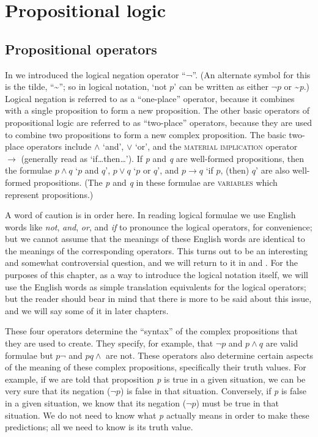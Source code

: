 \section{Propositional logic}\label{sec:4.3}
\subsection{Propositional operators}\label{sec:4.3.1}

In  we introduced the logical negation operator “¬”. (An alternate symbol for this is the tilde, “{\textasciitilde}”; so in logical notation, ‘not $p$’ can be written as either $\neg p$ or {\textasciitilde}\textit{p}.) Logical negation is referred to as a “one-place” operator, because it combines with a single proposition to form a new proposition. The other basic operators of propositional logic are referred to as “two-place” operators, because they are used to combine two propositions to form a new complex proposition. The basic two-place operators include $\wedge$ ‘and’, $\vee$ ‘or’, and the \textsc{material} \textsc{implication} operator $\rightarrow$ (generally read as ‘if…then…’). If \textit{p} and \textit{q} are well-formed propositions, then the formulae $p \wedge q$ ‘$p$ and $q$’, $p \vee q$ ‘$p$ or $q$’, and $p \rightarrow q$ ‘if $p$, (then) $q$’ are also well-formed propositions. (The \textit{p} and \textit{q} in these formulae are \textsc{variables} which represent propositions.)



A word of caution is in order here. In reading logical formulae we use English words like \textit{not}, \textit{and}, \textit{or}, and \textit{if} to pronounce the logical operators, for convenience; but we cannot assume that the meanings of these English words are identical to the meanings of the corresponding operators. This turns out to be an interesting and somewhat controversial question, and we will return to it in  and . For the purposes of this chapter, as a way to introduce the logical notation itself, we will use the English words as simple translation equivalents for the logical operators; but the reader should bear in mind that there is more to be said about this issue, and we will say some of it in later chapters.



These four operators determine the “syntax” of the complex propositions that they are used to create. They specify, for example, that $\neg p$ and $p \wedge q$ are valid formulae but $p\neg$ and $pq\wedge$ are not. These operators also determine certain aspects of the meaning of these complex propositions, specifically their truth values. For example, if we are told that proposition \textit{p} is true in a given situation, we can be very sure that its negation ($\neg p$) is false in that situation. Conversely, if \textit{p} is false in a given situation, we know that its negation ($\neg p$) must be true in that situation. We do not need to know what \textit{p} actually means in order to make these predictions; all we need to know is its truth value.



